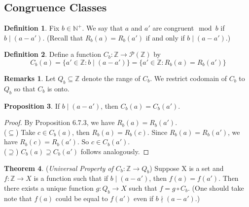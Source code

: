 \documentclass[14pt]{article}
\theoremstyle{definition}
\newtheorem*{remark}{Remarks}
\newtheorem{definition}{Definition}[subsection]
\newtheorem{proposition}[definition]{Proposition}
\newtheorem{theorem}[definition]{Theorem}
\begin{document}
\vspace{6mm} %

\subsection{Congruence Classes}

\begin{definition}
    Fix $b\in \mathbb{N}^+$. We say that $a$ and $a'$ are congruent$\mod b$ if $b\mid (a-a')$.
   (Recall that $R_b(a)=R_b(a')$ if and only if $b\mid (a-a')$.)
\end{definition}

\vspace{2mm} %

\begin{definition}
    Define a function $C_b\colon \mathbb{Z}\rightarrow \mathcal{P}(\mathbb{Z})$ by 
    \begin{equation*}
       C_b(a)=\{a'\in \mathbb{Z}\colon b\mid (a-a')\}=\{a'\in \mathbb{Z}\colon R_b(a)=R_b(a')\}
    \end{equation*}
\end{definition}

\begin{remark}
    Let $Q_b\subseteq \mathbb{Z}$ denote the range of $C_b$. We restrict codomain of $C_b$ to  $Q_b$ so that $C_b$ is onto.
\end{remark}

\vspace{2mm}

\begin{proposition}
    If $b\mid (a-a')$, then $C_b(a)=C_b(a')$.
\end{proposition}
\begin{proof}
    By Proposition 6.7.3, we have $R_b(a)=R_b(a')$.\\
    ($\subseteq$) Take $c\in C_b(a)$, then $R_b(a)=R_b(c)$. Since $R_b(a)=R_b(a')$, we have $R_b(c)=R_b(a')$. So $c\in C_b(a') $.\\
    ($\supseteq$) $C_b(a)\supseteq C_b(a')$ follows analogously.
\end{proof}

\vspace{2mm}

\begin{theorem}
    (\textit{Universal Property of $C_b\colon \mathbb{Z}\rightarrow Q_b$}) Suppose X is a set and $f\colon \mathbb{Z}\rightarrow X$ is a function such that if $b\mid (a-a')$, then $f(a)=f(a')$. Then there exists a unique function $g\colon Q_b\rightarrow X $ such that $f=g\circ C_b$.  (One should take note that $f(a)$ could be equal to $f(a')$ even if $b\nmid (a-a') $.)
\end{theorem}
    
\end{document}
